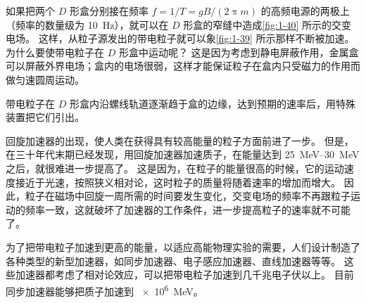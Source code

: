 如果把两个 $D$ 形盒分别接在频率 $f=1/T=gB/(2\uppi m)$ 的高频电源的两极上（频率的数量级为 \qty{10}{Hz}），就可以在 $D$ 形盒的窄缝中造成\cref{fig:1-40} 所示的交变电场。
这样，从粒子源发出的带电粒子就可以象\cref{fig:1-39} 所示那样不断被加速。
为什么要使带电粒子在 $D$ 形盒中运动呢？
这是因为考虑到静电屏蔽作用，金属盒可以屏蔽外界电场；盒内的电场很弱，这样才能保证粒子在盒内只受磁力的作用而做匀速圆周运动。

带电粒子在 $D$ 形盒内沿螺线轨道逐渐趋于盒的边缘，达到预期的速率后，用特殊装置把它们引出。

回旋加速器的出现，使人类在获得具有较高能量的粒子方面前进了一步。
但是，在三十年代末期已经发现，用回旋加速器加速质子，在能量达到 \qtyrange{25}{30}{MeV} 之后，就很难进一步提高了。
这是因为，在粒子的能量很高的时候，它的运动速度接近于光速，按照狭义相对论，这时粒子的质量将随着速率的增加而增大。
因此，粒子在磁场中回旋一周所需的时间要发生变化，交变电场的频率不再跟粒子运动的频率一致，这就破坏了加速器的工作条件，进一步提高粒子的速率就不可能了。

为了把带电粒子加速到更高的能量，以适应高能物理实验的需要，人们设计制造了各种类型的新型加速器，如同步加速器、电子感应加速器、直线加速器等等。
这些加速器都考虑了相对论效应，可以把带电粒子加速到几千兆电子伏以上。
目前同步加速器能够把质子加速到 \qty{e6}{MeV}。

